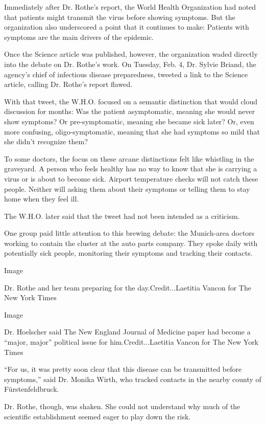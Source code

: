 Immediately after Dr. Rothe's report, the World Health Organization had
noted that patients might transmit the virus before showing symptoms.
But the organization also underscored a point that it continues to make:
Patients with symptoms are the main drivers of the epidemic.

Once the Science article was published, however, the organization waded
directly into the debate on Dr. Rothe's work. On Tuesday, Feb. 4, Dr.
Sylvie Briand, the agency's chief of infectious disease preparedness,
tweeted a link to the Science article, calling Dr. Rothe's report
flawed.

With that tweet, the W.H.O. focused on a semantic distinction that would
cloud discussion for months: Was the patient asymptomatic, meaning she
would never show symptoms? Or pre-symptomatic, meaning she became sick
later? Or, even more confusing, oligo-symptomatic, meaning that she had
symptoms so mild that she didn't recognize them?

To some doctors, the focus on these arcane distinctions felt like
whistling in the graveyard. A person who feels healthy has no way to
know that she is carrying a virus or is about to become sick. Airport
temperature checks will not catch these people. Neither will asking them
about their symptoms or telling them to stay home when they feel ill.

The W.H.O. later said that the tweet had not been intended as a
criticism.

One group paid little attention to this brewing debate: the Munich-area
doctors working to contain the cluster at the auto parts company. They
spoke daily with potentially sick people, monitoring their symptoms and
tracking their contacts.

Image

Dr. Rothe and her team preparing for the day.Credit...Laetitia Vancon
for The New York Times

Image

Dr. Hoelscher said The New England Journal of Medicine paper had become
a ``major, major'' political issue for him.Credit...Laetitia Vancon for
The New York Times

``For us, it was pretty soon clear that this disease can be transmitted
before symptoms,'' said Dr. Monika Wirth, who tracked contacts in the
nearby county of Fürstenfeldbruck.

Dr. Rothe, though, was shaken. She could not understand why much of the
scientific establishment seemed eager to play down the risk.

